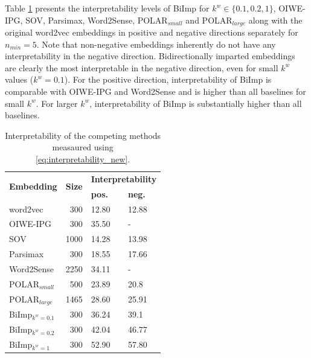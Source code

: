 \documentclass[11pt,a4paper]{article}
\def\proposedmethod{BiImp}
\begin{document}
Table
\ref{tab:interp_results} presents the interpretability
levels of \proposedmethod{} for $k^w \in \{0.1, 0.2, 1\}$,
OIWE-IPG, SOV, Parsimax, Word2Sense, POLAR$_{small}$ and
POLAR$_{large}$ along with the original word2vec embeddings
in positive and negative directions separately for $n_{min}
= 5$.  Note that non-negative embeddings inherently do not
have any interpretability in the negative
direction. Bidirectionally imparted embeddings are
clearly the most interpretable in the negative direction,
even for small $k^w$ values
($k^w = 0.1$). For the positive direction, interpretability
of \proposedmethod{} is comparable with OIWE-IPG and
Word2Sense and is higher than all baselines for
small $k^w$. For larger $k^w$, interpretability of
\proposedmethod{} is substantially higher than all baselines.


\begin{table}
    \centering
	\begin{tabular}{lrll}
	    \hline \hline
        \multirow{2}{*}{\textbf{Embedding}} & \multirow{2}{*}{\textbf{Size}} &  \multicolumn{2}{c}{\textbf{Interpretability}}\\
                 & & \textbf{pos.} & \textbf{neg.} \\\hline \hline %
        word2vec & 300 & 12.80 & 12.88 \\
        OIWE-IPG & 300 & 35.50 & - \\
        SOV & 1000 & 14.28 & 13.98 \\
        Parsimax & 300 & 18.55 & 17.66\\
        Word2Sense & 2250 & 34.11 & -\\
        POLAR$_{small}$ & 500 & 23.89 & 20.8\\
        POLAR$_{large}$ & 1465 & 28.60 & 25.91\\
        \proposedmethod{}$_{k^w = 0.1}$ & 300 & 36.24 & 39.1\\
        \proposedmethod{}$_{k^w = 0.2}$ & 300 & 42.04 & 46.77\\
        \proposedmethod{}$_{k^w = 1}$ & 300 & 52.90 & 57.80\\
        \hline \hline
	\end{tabular}
	\caption{ Interpretability of the competing methods measaured using \eqref{eq:interpretability_new}. }
	\label{tab:interp_results}
\end{table}
\end{document}
